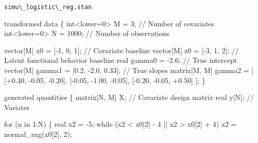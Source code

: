 \documentclass[
  letterpaper,
  DIV=11,
  numbers=noendperiod]{scrartcl}
\newenvironment{Shaded}{\begin{snugshade}}{\end{snugshade}}
\newcommand{\CommentTok}[1]{\textcolor[rgb]{0.37,0.37,0.37}{#1}}
\newcommand{\ControlFlowTok}[1]{\textcolor[rgb]{0.00,0.23,0.31}{#1}}
\newcommand{\DataTypeTok}[1]{\textcolor[rgb]{0.68,0.00,0.00}{#1}}
\newcommand{\DecValTok}[1]{\textcolor[rgb]{0.68,0.00,0.00}{#1}}
\newcommand{\FloatTok}[1]{\textcolor[rgb]{0.68,0.00,0.00}{#1}}
\newcommand{\KeywordTok}[1]{\textcolor[rgb]{0.00,0.23,0.31}{#1}}
\newcommand{\NormalTok}[1]{\textcolor[rgb]{0.00,0.23,0.31}{#1}}
\begin{document}
\begin{codelisting}

\caption{\texttt{simu\textbackslash\_logistic\textbackslash\_reg.stan}}

\begin{Shaded}
\begin{Highlighting}[]
\KeywordTok{transformed data}\NormalTok{ \{}
  \DataTypeTok{int}\NormalTok{\textless{}}\KeywordTok{lower}\NormalTok{=}\DecValTok{0}\NormalTok{\textgreater{} M = }\DecValTok{3}\NormalTok{;         }\CommentTok{// Number of covariates}
  \DataTypeTok{int}\NormalTok{\textless{}}\KeywordTok{lower}\NormalTok{=}\DecValTok{0}\NormalTok{\textgreater{} N = }\DecValTok{1000}\NormalTok{;      }\CommentTok{// Number of observations}
  
  \DataTypeTok{vector}\NormalTok{[M] x0 = [{-}}\DecValTok{1}\NormalTok{, }\DecValTok{0}\NormalTok{, }\DecValTok{1}\NormalTok{]\textquotesingle{}; }\CommentTok{// Covariate baseline}
  \DataTypeTok{vector}\NormalTok{[M] z0 = [{-}}\DecValTok{3}\NormalTok{, }\DecValTok{1}\NormalTok{, }\DecValTok{2}\NormalTok{]\textquotesingle{}; }\CommentTok{// Latent functional behavior baseline}
  \DataTypeTok{real}\NormalTok{ gamma0 = {-}}\FloatTok{2.6}\NormalTok{;                      }\CommentTok{// True intercept}
  \DataTypeTok{vector}\NormalTok{[M] gamma1 = [}\FloatTok{0.2}\NormalTok{, {-}}\FloatTok{2.0}\NormalTok{, }\FloatTok{0.33}\NormalTok{]\textquotesingle{};   }\CommentTok{// True slopes}
  \DataTypeTok{matrix}\NormalTok{[M, M] gamma2 = [ [+}\FloatTok{0.40}\NormalTok{, {-}}\FloatTok{0.05}\NormalTok{, {-}}\FloatTok{0.20}\NormalTok{],}
\NormalTok{                          [{-}}\FloatTok{0.05}\NormalTok{, {-}}\FloatTok{1.00}\NormalTok{, {-}}\FloatTok{0.05}\NormalTok{],}
\NormalTok{                          [{-}}\FloatTok{0.20}\NormalTok{, {-}}\FloatTok{0.05}\NormalTok{, +}\FloatTok{0.50}\NormalTok{] ];}
\NormalTok{\}}

\KeywordTok{generated quantities}\NormalTok{ \{}
  \DataTypeTok{matrix}\NormalTok{[N, M] X; }\CommentTok{// Covariate design matrix}
  \DataTypeTok{real}\NormalTok{ y[N];      }\CommentTok{// Variates}

  \ControlFlowTok{for}\NormalTok{ (n }\ControlFlowTok{in} \DecValTok{1}\NormalTok{:N) \{}
    \DataTypeTok{real}\NormalTok{ x2 = {-}}\DecValTok{5}\NormalTok{;}
    \ControlFlowTok{while}\NormalTok{ (x2 \textless{} x0[}\DecValTok{2}\NormalTok{] {-} }\DecValTok{4}\NormalTok{ || x2 \textgreater{} x0[}\DecValTok{2}\NormalTok{] + }\DecValTok{4}\NormalTok{)}
\NormalTok{      x2 = normal\_rng(x0[}\DecValTok{2}\NormalTok{], }\DecValTok{2}\NormalTok{);}
    

\end{Highlighting}
\end{Shaded}
\end{codelisting}
\end{document}
